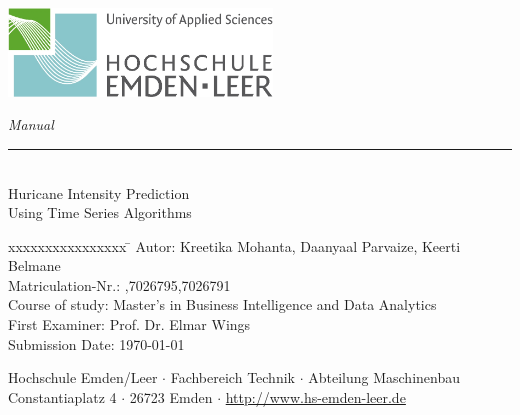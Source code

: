 %
%

\begin{titlepage}
    
    \begin{flushleft} 
        \includegraphics[width=7cm]{General/technik.jpg}
    \end{flushleft} 
    
    \begin{flushright}
        \vspace{2cm}
        \LARGE \textsl{Manual}\\
        \rule{0.6\textwidth}{0.4pt} ~\\
        \vspace{0.5cm}
        \textsf{\LARGE Huricane Intensity Prediction}\\
        \textsf{\LARGE Using Time Series Algorithms}
    \end{flushright}
    
    \vspace{3cm}
    \large
    \begin{tabbing}
        xxxxxxxxxxxxxxxx \= \kill
        Autor: \> Kreetika Mohanta, Daanyaal Parvaize, Keerti Belmane \\
        Matriculation-Nr.: ,\hspace{2.3cm}7026795,\hspace{2.4cm}7026791 \\
        Course of study: \> Master's in Business Intelligence and Data Analytics \\ [0.5cm]
        First Examiner: \> Prof. Dr. Elmar Wings \\
        Submission Date: \> \today \\
    \end{tabbing}
    
    \vspace{3cm}
    \small
    \begin{center}
        Hochschule Emden/Leer $\cdot$ 
        Fachbereich Technik $\cdot$ 
        Abteilung Maschinenbau \\
        Constantiaplatz 4 $\cdot$ 
        26723 Emden $\cdot$ 
        \url{http://www.hs-emden-leer.de}
    \end{center}
    
\end{titlepage}
